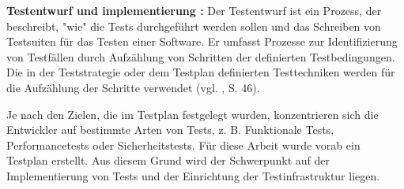 \textbf{Testentwurf und implementierung :} Der Testentwurf ist ein Prozess,
der beschreibt, "wie" die Tests durchgeführt werden sollen und das
Schreiben von Testsuiten für das Testen einer Software. Er umfasst Prozesse
zur Identifizierung von Testfällen durch Aufzählung von Schritten der
definierten Testbedingungen. Die in der Teststrategie oder dem Testplan
definierten Testtechniken werden für die Aufzählung
der Schritte verwendet (vgl. \cite{shultz2011software}, S. 46).



Je nach den Zielen, die im Testplan festgelegt wurden, konzentrieren sich die
Entwickler auf bestimmte Arten von Tests, z. B. Funktionale Tests,
Performancetests oder Sicherheitstests. Für diese Arbeit wurde vorab ein
Testplan erstellt. Aus diesem Grund wird der Schwerpunkt auf der Implementierung
von Tests und der Einrichtung der Testinfrastruktur liegen.


